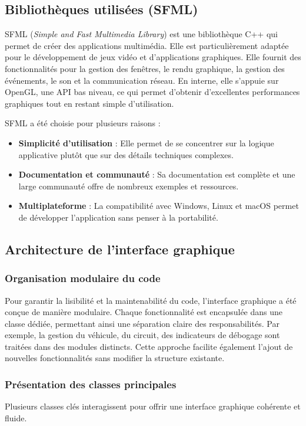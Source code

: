 \subsection{Bibliothèques utilisées (SFML)}\label{subsec:sfml}
SFML (\textit{Simple and Fast Multimedia Library}) est une bibliothèque C++ qui permet de créer des applications multimédia.
Elle est particulièrement adaptée pour le développement de jeux vidéo et d'applications graphiques.
Elle fournit des fonctionnalités pour la gestion des fenêtres, le rendu graphique, la gestion des événements, le son et la communication réseau.
En interne, elle s'appuie sur OpenGL, une API bas niveau, ce qui permet d'obtenir d'excellentes performances graphiques tout en restant simple d'utilisation.

SFML a été choisie pour plusieurs raisons :
\begin{itemize}
    \item \textbf{Simplicité d'utilisation} : Elle permet de se concentrer sur la logique applicative plutôt que sur des détails techniques complexes.
    \item \textbf{Documentation et communauté} : Sa documentation\cite{documentationSFML} est complète et une large communauté offre de nombreux exemples et ressources.
    \item \textbf{Multiplateforme} : La compatibilité avec Windows, Linux et macOS permet de développer l'application sans penser à la portabilité.
\end{itemize}

\subsection{Architecture de l'interface graphique}\label{subsec:architecture-de-l-interface-graphique}
\subsubsection{Organisation modulaire du code}\label{subsubsec:organisation-modulaire-du-code}
Pour garantir la lisibilité et la maintenabilité du code, l'interface graphique a été conçue de manière modulaire.
Chaque fonctionnalité est encapsulée dans une classe dédiée, permettant ainsi une séparation claire des responsabilités.
Par exemple, la gestion du véhicule, du circuit, des indicateurs de débogage sont traitées dans des modules distincts.
Cette approche facilite également l'ajout de nouvelles fonctionnalités sans modifier la structure existante.

\subsubsection{Présentation des classes principales}\label{subsubsec:presentation-des-classes-principales}
Plusieurs classes clés interagissent pour offrir une interface graphique cohérente et fluide.


